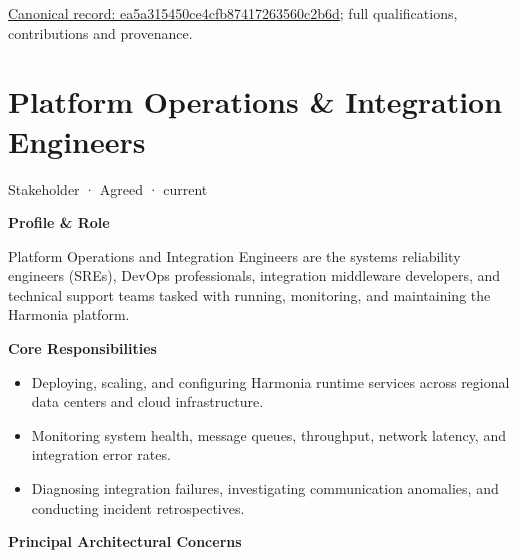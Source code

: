 {\footnotesize \href{../../../../continuum/motivation/stakeholder/ea5a315450ce4cfb87417263560c2b6d.md}{Canonical record: ea5a315450ce4cfb87417263560c2b6d}; full qualifications, contributions and provenance.}\par
\section{Platform Operations \& Integration Engineers}

\label{element:c20aa17ce4aa4a58be5eb3cff2ecdd1d}
{\small Stakeholder · Agreed · current}\par

\par\medskip\textbf{Profile \& Role}\par


Platform Operations and Integration Engineers are the systems reliability engineers (SREs), DevOps professionals, integration middleware developers, and technical support teams tasked with running, monitoring, and maintaining the Harmonia platform.



\par\medskip\textbf{Core Responsibilities}\par


\begin{itemize}


\item Deploying, scaling, and configuring Harmonia runtime services across regional data centers and cloud infrastructure.

\item Monitoring system health, message queues, throughput, network latency, and integration error rates.

\item Diagnosing integration failures, investigating communication anomalies, and conducting incident retrospectives.

\end{itemize}


\par\medskip\textbf{Principal Architectural Concerns}\par


